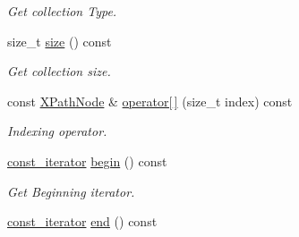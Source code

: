 \begin{DoxyCompactItemize}
\begin{DoxyCompactList}\small\item\em Get collection Type. \item\end{DoxyCompactList}\item 
size\_\-t \hyperlink{classphys_1_1xml_1_1XPathNodeSet_a306178fdaf66f2d0ccefd617f7afc7f3}{size} () const 
\begin{DoxyCompactList}\small\item\em Get collection size. \item\end{DoxyCompactList}\item 
const \hyperlink{classphys_1_1xml_1_1XPathNode}{XPathNode} \& \hyperlink{classphys_1_1xml_1_1XPathNodeSet_ad620a6cd79b94ae644d10a10d0519029}{operator\mbox{[}$\,$\mbox{]}} (size\_\-t index) const 
\begin{DoxyCompactList}\small\item\em Indexing operator. \item\end{DoxyCompactList}\item 
\hyperlink{classphys_1_1xml_1_1XPathNode}{const\_\-iterator} \hyperlink{classphys_1_1xml_1_1XPathNodeSet_a887d84cf19f5d2155ab9153bc02e8d1e}{begin} () const 
\begin{DoxyCompactList}\small\item\em Get Beginning iterator. \item\end{DoxyCompactList}\item 
\hypertarget{classphys_1_1xml_1_1XPathNodeSet_a1b5507aca9b87bbaa0c698f293ae8fd4}{
\hyperlink{classphys_1_1xml_1_1XPathNode}{const\_\-iterator} \hyperlink{classphys_1_1xml_1_1XPathNodeSet_a1b5507aca9b87bbaa0c698f293ae8fd4}{end} () const }
\label{de/dc2/classphys_1_1xml_1_1XPathNodeSet_a1b5507aca9b87bbaa0c698f293ae8fd4}


\end{DoxyCompactItemize}
